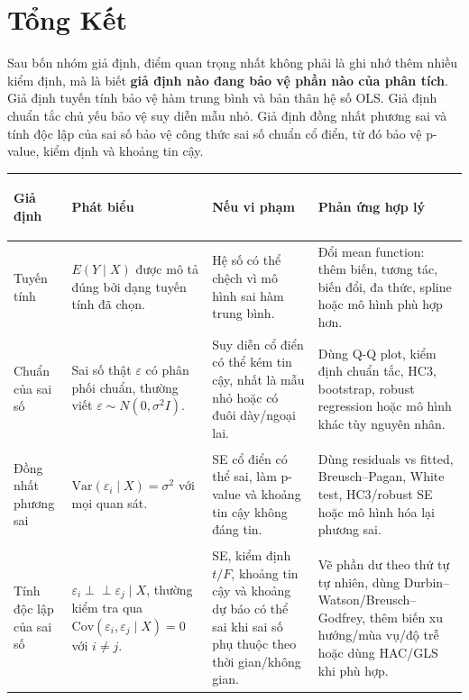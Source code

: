 \section*{Tổng Kết}

Sau bốn nhóm giả định, điểm quan trọng nhất không phải là ghi nhớ thêm nhiều kiểm định, mà là biết \textbf{giả định nào đang bảo vệ phần nào của phân tích}. Giả định tuyến tính bảo vệ hàm trung bình và bản thân hệ số OLS. Giả định chuẩn tắc chủ yếu bảo vệ suy diễn mẫu nhỏ. Giả định đồng nhất phương sai và tính độc lập của sai số bảo vệ công thức sai số chuẩn cổ điển, từ đó bảo vệ p-value, kiểm định và khoảng tin cậy.

\begin{center}
\small
\begin{tabularx}{\textwidth}{@{}>{\bfseries\raggedright\arraybackslash}p{3.8cm}>{\raggedright\arraybackslash}X>{\raggedright\arraybackslash}X>{\raggedright\arraybackslash}X@{}}
\toprule
Giả định & Phát biểu & Nếu vi phạm & Phản ứng hợp lý \\
\midrule
Tuyến tính & $E(Y\mid X)$ được mô tả đúng bởi dạng tuyến tính đã chọn. & Hệ số có thể chệch vì mô hình sai hàm trung bình. & Đổi mean function: thêm biến, tương tác, biến đổi, đa thức, spline hoặc mô hình phù hợp hơn. \\
Chuẩn của sai số & Sai số thật $\varepsilon$ có phân phối chuẩn, thường viết $\varepsilon\sim N(0,\sigma^2I)$. & Suy diễn cổ điển có thể kém tin cậy, nhất là mẫu nhỏ hoặc có đuôi dày/ngoại lai. & Dùng Q-Q plot, kiểm định chuẩn tắc, HC3, bootstrap, robust regression hoặc mô hình khác tùy nguyên nhân. \\
Đồng nhất phương sai & $\mathrm{Var}(\varepsilon_i\mid X)=\sigma^2$ với mọi quan sát. & SE cổ điển có thể sai, làm p-value và khoảng tin cậy không đáng tin. & Dùng residuals vs fitted, Breusch--Pagan, White test, HC3/robust SE hoặc mô hình hóa lại phương sai. \\
Tính độc lập của sai số & $\varepsilon_i \perp\!\!\!\perp \varepsilon_j\mid X$, thường kiểm tra qua $\mathrm{Cov}(\varepsilon_i,\varepsilon_j\mid X)=0$ với $i\neq j$. & SE, kiểm định $t/F$, khoảng tin cậy và khoảng dự báo có thể sai khi sai số phụ thuộc theo thời gian/không gian. & Vẽ phần dư theo thứ tự tự nhiên, dùng Durbin--Watson/Breusch--Godfrey, thêm biến xu hướng/mùa vụ/độ trễ hoặc dùng HAC/GLS khi phù hợp. \\
\bottomrule
\end{tabularx}
\end{center}

